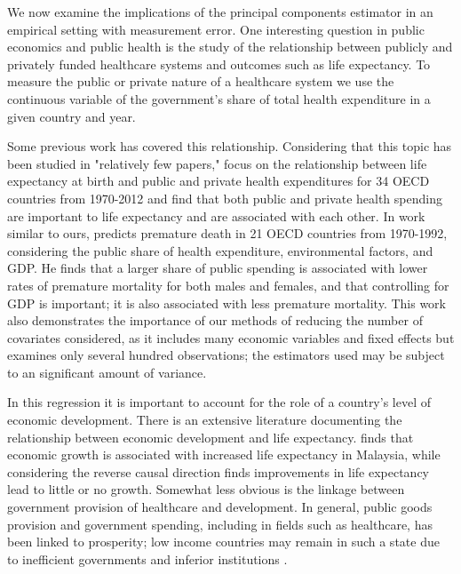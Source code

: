 \documentclass[10pt]{article}
\begin{document}
        We now examine the implications of the principal components estimator in an empirical setting with measurement error. One interesting question in public economics and public health is the study of the relationship between publicly and privately funded healthcare systems and outcomes such as life expectancy. To measure the public or private nature of a healthcare system we use the continuous variable of the government's share of total health expenditure in a given country and year.

        Some previous work has covered this relationship. Considering that this topic has been studied in "relatively few papers," \cite{linden_life_2017} focus on the relationship between life expectancy at birth and public and private health expenditures for 34 OECD countries from 1970-2012 and find that both public and private health spending are important to life expectancy and are associated with each other. In work similar to ours, \cite{or_determinants_2000} predicts premature death in 21 OECD countries from 1970-1992, considering the public share of health expenditure, environmental factors, and GDP. He finds that a larger share of public spending is associated with lower rates of premature mortality for both males and females, and that controlling for GDP is important; it is also associated with less premature mortality. This work also demonstrates the importance of our methods of reducing the number of covariates considered, as it includes many economic variables and fixed effects but examines only several hundred observations; the estimators used may be subject to an significant amount of variance.

        In this regression it is important to account for the role of a country's level of economic development. There is an extensive literature documenting the relationship between economic development and life expectancy. \cite{ling_testing_2017} finds that economic growth is associated with increased life expectancy in Malaysia, while considering the reverse causal direction \cite{acemoglu_disease_2007} finds improvements in life expectancy lead to little or no growth. Somewhat less obvious is the linkage between government provision of healthcare and development. In general, public goods provision and government spending, including in fields such as healthcare, has been linked to prosperity; low income countries may remain in such a state due to inefficient governments and inferior institutions \citep{wu_impact_2010}.
\end{document}
